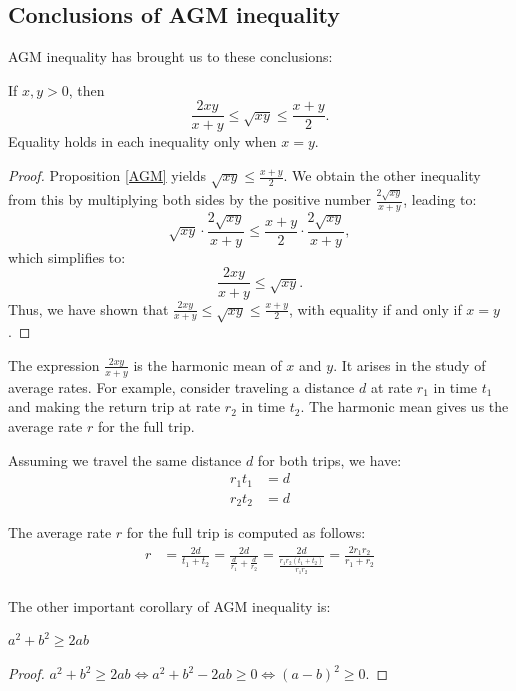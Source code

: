 \documentclass[
	12pt, %
	fleqn, %
	a4paper, %
]{LegrandOrangeBook}
\begin{document}
\subsection*{Conclusions of AGM inequality}
AGM inequality has brought us to these conclusions:
    \begin{corollary}
If $x, y > 0$, then
\[\frac{2xy}{x+y} \leq \sqrt{xy} \leq \frac{x+y}{2}.\]
Equality holds in each inequality only when $x = y$.
\end{corollary}

\begin{proof}
Proposition \ref{AGM} yields $\sqrt{xy} \leq \frac{x+y}{2}$. We obtain the other inequality from this by multiplying both sides by the positive number $\frac{2\sqrt{xy}}{x+y}$, leading to:
\[\sqrt{xy} \cdot \frac{2\sqrt{xy}}{x+y} \leq \frac{x+y}{2} \cdot \frac{2\sqrt{xy}}{x+y},\]
which simplifies to:
\[\frac{2xy}{x+y} \leq \sqrt{xy}.\]
Thus, we have shown that $\frac{2xy}{x+y} \leq \sqrt{xy} \leq \frac{x+y}{2}$, with equality if and only if $x = y$.
\end{proof}
The expression $\frac{2xy}{x+y}$ is the harmonic mean of $x$ and $y$. It arises in the study of average rates. For example, consider traveling a distance $d$ at rate $r_1$ in time $t_1$ and making the return trip at rate $r_2$ in time $t_2$. The harmonic mean gives us the average rate $r$ for the full trip.

Assuming we travel the same distance $d$ for both trips, we have:
\begin{align*}
r_1t_1 &= d \\
r_2t_2 &= d
\end{align*}

The average rate $r$ for the full trip is computed as follows:
\begin{align*}
r &= \frac{2d}{t_1 + t_2} = \frac{2d}{\frac{d}{r_1} + \frac{d}{r_2}} = \frac{2d}{\frac{r_1r_2(t_1 + t_2)}{r_1r_2}} =\frac{2r_1r_2}{r_1 + r_2}\\
\end{align*}

The other important corollary of AGM inequality is:
\begin{corollary}
    $a^2+b^2 \geq 2ab$
\end{corollary}
\begin{proof}
    $a^2 + b^2 \geq 2ab \iff a^2 + b^2 - 2ab \geq 0 \iff (a - b)^2 \geq 0.$
\end{proof}
\end{document}
